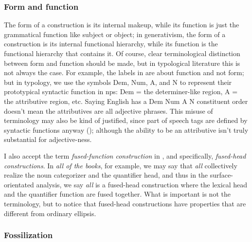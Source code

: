 \documentclass[UTF8, a4paper, oneside, scheme=plain, 12pt]{ctexbook}
\newcommand*{\term}[1]{\emph{#1}}
\newcommand{\form}[1]{\emph{#1}}
\begin{document}
{\subsubsection{Form and function}

The form of a construction is its internal makeup, 
while its function is just the grammatical function like subject or object;
in generativism, 
the form of a construction is its internal functional hierarchy, 
while its function is the functional hierarchy that contains it.
Of course, clear terminological distinction between form and function 
should be made, 
but in typological literature this is not always the case. 
For example, the labels in  are about function and not form;
but in typology, we use the symbols Dem, Num, A, and N to represent
their prototypical syntactic function in \acs{np}s:
Dem = the determiner-like region, 
A = the attributive region, etc. 
Saying English has a Dem Num A N constituent order 
doesn't mean the attributives are all adjective phrases.
This misuse of terminology may also be kind of justified,
since part of speech tags are defined by syntactic functions anyway
(); 
although the ability to be an attributive isn't truly substantial 
for adjective-ness.

I also accept the term \term{fused-function construction} in \citet{cgel},
and specifically, \form{fused-head constructions}.
In \form{all of the books}, for example, 
we may say that \form{all} collectively realize the noun categorizer and the quantifier head, 
and thus in the surface-orientated analysis, 
we say \form{all} is a fused-head construction 
where the lexical head and the quantifier function are fused together.
What is important is not the terminology,
but to notice that fused-head constructions 
have properties that are different from 
ordinary ellipsis. 

\subsubsection{Fossilization}

}
\end{document}

